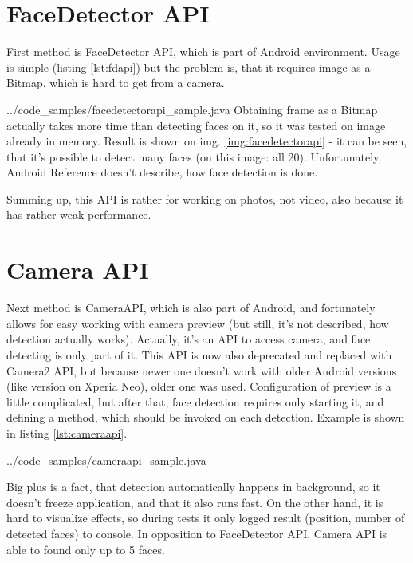 
\section{FaceDetector API}
First method is FaceDetector API, which is part of Android environment.
Usage is simple (listing \ref{lst:fdapi}) but the problem is, that it requires
image as a Bitmap, which is hard to get from a camera.

{../code_samples/facedetectorapi_sample.java}
Obtaining frame as a Bitmap actually takes more time than detecting faces on it,
so it was tested on image already in memory.
Result is shown on img. \ref{img:facedetectorapi} - it can be seen, that it's
possible to detect many faces (on this image: all 20).
Unfortunately, Android Reference \cite{android_reference} doesn't describe, how
face detection is done.

Summing up, this API is rather for working on photos, not video, also
because it has rather weak performance.


\section{Camera API}
Next method is CameraAPI, which is also part of Android, and fortunately allows
for easy working with camera preview (but still, it's not described, how
detection actually works).
Actually, it's an API to access camera, and face detecting is only part of it.
This API is now also deprecated and replaced with Camera2 API, but because newer
one doesn't work with older Android versions (like version on Xperia Neo), older
one was used. 
Configuration of preview is a little complicated, but after that,
face detection requires only starting it, and defining a method, which should be
invoked on each detection. Example is shown in listing \ref{lst:cameraapi}.

{../code_samples/cameraapi_sample.java}

Big plus is a fact, that detection automatically happens in background, so it
doesn't freeze application, and that it also runs fast.
On the other hand, it is hard to visualize effects, so during tests it only
logged result (position, number of detected faces) to console.
In opposition to FaceDetector API, Camera API is able to found only up to 5
faces.


